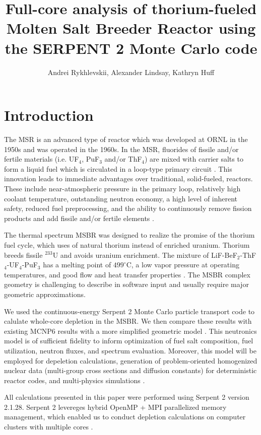 \documentclass{anstrans}
\title{Full-core analysis of thorium-fueled Molten Salt Breeder Reactor using 
the SERPENT 2 Monte Carlo code}
\author{Andrei Rykhlevskii, Alexander Lindsay, Kathryn Huff}
\institute{
Department of Nuclear, Plasma, and Radiological Engineering, University of 
Illinois at Urbana-Champaign \break
Urbana, IL
}
\begin{document}
\section{Introduction}
The \gls{MSR} is an advanced type of reactor which was developed at \gls{ORNL} 
in the 1950s and was operated in the 1960s. In the MSR, fluorides of fissile 
and/or fertile materials (i.e. UF$_4$, PuF$_3$ and/or ThF$_4$) are mixed with 
carrier salts to form a liquid fuel which is circulated in a loop-type primary 
circuit \cite{haubenreich_experience_1970}. This innovation leads to immediate 
advantages over traditional, solid-fueled, reactors. These include 
near-atmospheric pressure in the primary loop, relatively high coolant 
temperature, outstanding neutron economy, a high level of inherent safety, 
reduced fuel preprocessing, and the ability to continuously remove fission 
products and add fissile and/or fertile elements \cite{leblanc_molten_2010}. 

The thermal spectrum \gls{MSBR} was designed to realize the promise of the 
thorium fuel cycle, which uses of natural thorium instead of enriched uranium.  
Thorium breeds fissile $^{233}$U and avoids uranium enrichment. The mixture of 
LiF-BeF$_2$-ThF$_4$-UF$_4$-PuF$_3$ has a melting point of $499^\circ$C, a low 
vapor pressure at operating temperatures, and good flow and heat transfer 
properties \cite{robertson_conceptual_1971}. The \gls{MSBR} complex geometry is 
challenging to describe in software input and usually require major geometric 
approximations\cite{park_whole_2015}. 

We used the continuous-energy Serpent 2 Monte Carlo particle transport code to 
calulate whole-core depletion in the \gls{MSBR}. We then compare these results 
with existing MCNP6 results with a more simplified geometric model 
\cite{park_whole_2015,leppanen_serpent_2012}. This neutronics model is of 
sufficient fidelity to inform optimization of fuel salt composition, fuel 
utilization, neutron fluxes, and spectrum evaluation. Moreover, this model  
will be employed for depeletion calculations, generation of problem-oriented 
homogenized nuclear data (multi-group cross sections and diffusion constants) 
for deterministic reactor codes, and multi-physics simulations 
\cite{fridman_use_2011,valtavirta_coupled_2017}.

All calculations presented in this paper were performed using Serpent 2 version 
2.1.28. Serpent 2 levereges hybrid OpenMP + MPI parallelized memory management, 
which enabled us to conduct depletion calculations on computer clusters with 
multiple cores \cite{leppanen_serpent_2015}. 
\end{document}

